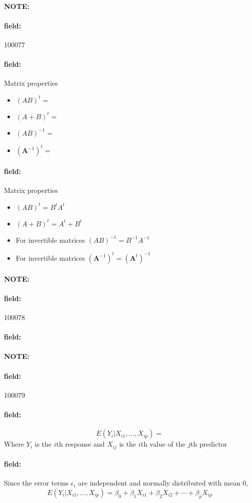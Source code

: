 \documentclass[12pt]{article}
\newenvironment{note}{\paragraph{NOTE:}}{}
\newenvironment{field}{\paragraph{field:}}{}
\begin{document}

\begin{note} \begin{field} \tiny 100077 \end{field}
 \begin{field}
  Matrix properties
  \begin{itemize}
   \item $(AB)^{t} = $
   \item $(A+B)^t = $
   \item $(AB)^{-1} = $
   \item $(\mathbf{A}^{-1})^t = $
  \end{itemize}
 \end{field}
 \begin{field}
  Matrix properties
  \begin{itemize}
   \item $(AB)^{t} = B^tA^t$
   \item $(A+B)^t = A^t + B^t$
   \item For invertible matrices $(AB)^{-1} = B^{-1}A^{-1}$
   \item For invertible matrices $(\mathbf{A}^{-1})^t = (\mathbf{A}^t)^{-1}$
  \end{itemize}
 \end{field}
\end{note}

\begin{note} \begin{field} \tiny 100078 \end{field}
 \begin{field}

 \end{field}
\end{note}


\begin{note} \begin{field} \tiny 100079 \end{field}
 \begin{field}
  $$ E(Y_i | X_{i1}, \ldots , X_{ip}) = $$
  Where $Y_i$ is the $i$th response and $X_{ij}$ is the $i$th value of the $j$th predictor
 \end{field}
 \begin{field}
  Since the error terms $\epsilon_i$ are independent and normally distributed with mean 0,
  $$ E(Y_i | X_{i1}, \ldots , X_{ip}) = \beta_0 + \beta_1 X_{i1} + \beta_2 X_{i2} + \cdots + \beta_pX_{ip}$$
 \end{field}
\end{note}
\end{document}
